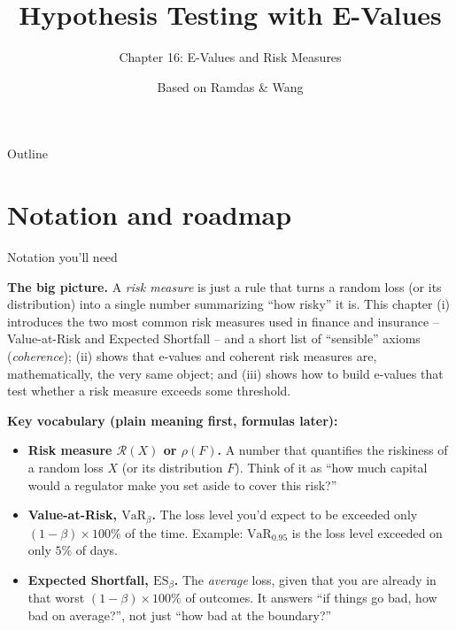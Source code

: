 \documentclass[aspectratio=169,10pt]{beamer}
\title[E-Values -- Ch.16]{Hypothesis Testing with E-Values}
\subtitle{Chapter 16: E-Values and Risk Measures}
\author{Based on Ramdas \& Wang}
\date{}
\newcommand{\1}{\mathbb{1}}
\begin{document}
\begin{frame}
\titlepage
\end{frame}

\begin{frame}{Outline}
\tableofcontents
\end{frame}

\section{Notation and roadmap}

\begin{frame}[allowframebreaks]{Notation you'll need}

\textbf{The big picture.} A \emph{risk measure} is just a rule that turns a random loss (or its distribution) into a single number summarizing ``how risky'' it is. This chapter (i) introduces the two most common risk measures used in finance and insurance -- Value-at-Risk and Expected Shortfall -- and a short list of ``sensible'' axioms (\emph{coherence}); (ii) shows that e-values and coherent risk measures are, mathematically, the very same object; and (iii) shows how to build e-values that test whether a risk measure exceeds some threshold.

\vspace{2mm}
\textbf{Key vocabulary (plain meaning first, formulas later):}

\begin{itemize}
\item \textbf{Risk measure $\mathcal R(X)$ or $\rho(F)$.} A number that quantifies the riskiness of a random loss $X$ (or its distribution $F$). Think of it as ``how much capital would a regulator make you set aside to cover this risk?''

\item \textbf{Value-at-Risk, $\mathrm{VaR}_\beta$.} The loss level you'd expect to be exceeded only $(1-\beta)\times 100\%$ of the time. Example: $\mathrm{VaR}_{0.95}$ is the loss level exceeded on only $5\%$ of days.

\item \textbf{Expected Shortfall, $\mathrm{ES}_\beta$.} The \emph{average} loss, given that you are already in that worst $(1-\beta)\times100\%$ of outcomes. It answers ``if things go bad, how bad on average?'', not just ``how bad at the boundary?''


\end{itemize}
\end{frame}
\end{document}
